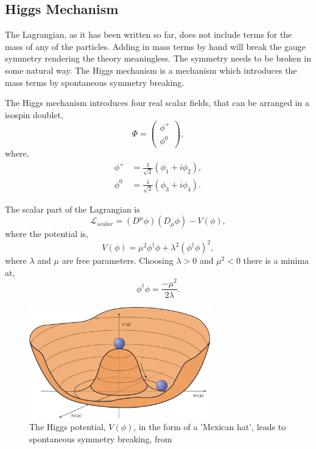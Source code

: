 \subsection{Higgs Mechanism}
\label{sec:higgs}
The Lagrangian, as it has been written so far, does not include terms for the
mass of any of the particles. 
Adding in mass terms by hand will break the
gauge symmetry rendering the theory meaningless. The symmetry needs to be broken
in some natural way.
The Higgs mechanism is a mechanism which introduces the mass terms by
spontaneous symmetry breaking.

The Higgs mechanism introduces four real scalar fields, that can be arranged in a
isospin doublet,
\begin{equation}
\Phi = \left( \begin{matrix} \phi^{+} \\ \phi^{0} \end{matrix} \right),
\end{equation}
where,
\begin{align*}
\phi^{+} &=\frac{1}{\sqrt{2}} (\phi_{1} + i \phi_{2}),\\
\phi^{0} &=\frac{1}{\sqrt{2}} (\phi_{3} + i \phi_{4}).
\end{align*}

The scalar part of the Lagrangian is
\begin{equation}
\mathcal{L}_{scalar} = 
\left(D^{\mu}\phi\right) \left(D_{\mu}\phi\right) - V(\phi),
\end{equation}
where the potential is,
\begin{equation}
V(\phi) = 
\mu^{2}\phi^{\dagger}\phi + 
\lambda^{2} \left( \phi^{\dagger} \phi \right)^{2},
\end{equation}
where $\lambda$ and $\mu$ are free parameters. Choosing  $\lambda>0$ and
$\mu^{2}<0$ there is a minima at,
\begin{equation}
\phi^{\dagger} \phi = \frac{- \mu^{2}}{2 \lambda}.
\end{equation}

\begin{figure}[htbp]
  \centering
  \includegraphics[width=0.7\textwidth]{nphys1874-f1.jpg}
  \caption{ The Higgs potential, $V(\phi)$, in the form of a 'Mexican hat',
leads to spontaneous symmetry breaking, from \cite{}}
  \label{fig:higgspot}
\end{figure}

